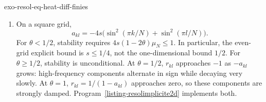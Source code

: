 \begin{correction}{exo-resol-eq-heat-diff-finies}
\begin{enumerate}
\item On a square grid,
\[
 a_{kl}=-4s\bigl(\sin^2(\pi k/N)+\sin^2(\pi l/N)\bigr).
\]
For $\theta<1/2$, stability requires
$4s(1-2\theta)\mu_N\leq1$. In particular, the even-grid explicit bound
is $s\leq1/4$, not the one-dimensional bound $1/2$.
For $\theta\geq1/2$, stability is unconditional.
At $\theta=1/2$, $r_{kl}$ approaches $-1$ as $-a_{kl}$ grows:
high-frequency components alternate in sign while decaying very slowly.
At $\theta=1$, $r_{kl}=1/(1-a_{kl})$ approaches zero, so these components
are strongly damped. Program~\ref{listing-resolimplicite2d} implements both.
\begin{listing}[H]
\caption{The theta method on a periodic rectangular grid.}
\label{listing-resolimplicite2d}
\end{listing}
\end{enumerate}
\end{correction}

